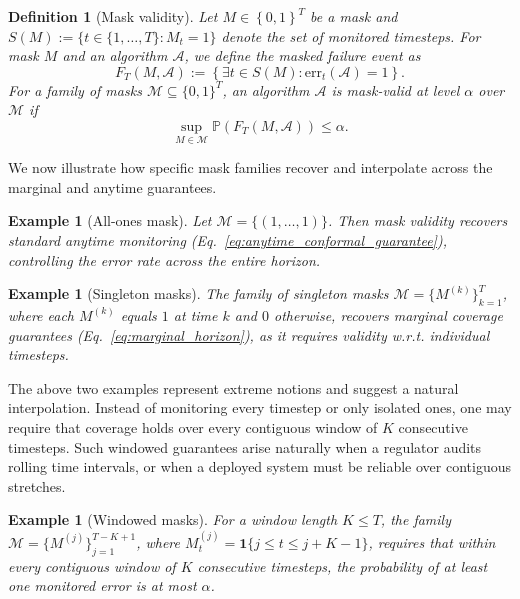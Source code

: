 \documentclass{uai2026} %
\newtheorem{definition}[theorem]{Definition}
\newtheorem{example}[theorem]{Example}
\newcommand{\1}{\mathbf{1}}
\newcommand{\ind}[1]{\mathbf{1}\{#1\}}
\newcommand{\prob}{\mathbb{P}}
\newcommand{\ens}[1]{\left\{#1\right\}}
\newcommand{\err}{\mathrm{err}}
\newcommand{\mcal}{\mathcal{M}}
\newcommand{\acal}{\mathcal{A}}
\begin{document}
\begin{definition}[Mask validity]
  \label{def:mask-validity}
  Let $M\in \ens{0,1}^T$ be a mask and $S(M) := \{t \in \{1,\dots,T\} \colon M_t=1\}$ denote the set of monitored timesteps. For mask $M$ and an algorithm $\acal$, we define the masked failure event as
  \begin{equation}
    \label{eq:mask_valid_norestart}
    F_T(M, \acal):=\left\{\exists t\in S(M)\colon \err_t(\acal) = 1\right\}.
  \end{equation}
  For a family of masks $\mcal \subseteq\{0,1\}^T$, an algorithm $\acal$ is \emph{mask-valid at level $\alpha$ over $\mcal$} if
  \begin{equation*}
    \sup_{M\in\mcal}\prob(F_T(M, \acal))\le\alpha.
  \end{equation*}
\end{definition}

We now illustrate how specific mask families recover and interpolate across the marginal and anytime guarantees.

\begin{example}[All-ones mask]
  Let $\mcal = \{(1, \ldots, 1)\}$. Then mask validity recovers standard anytime monitoring (Eq.~\ref{eq:anytime_conformal_guarantee}), controlling the error rate across the entire horizon.
\end{example}

\begin{example}[Singleton masks]
  The family of singleton masks $\mcal = \{ M^{(k)} \}_{k=1}^T$, where each $M^{(k)}$ equals $1$ at time $k$ and $0$ otherwise, recovers marginal coverage guarantees (Eq.~\ref{eq:marginal_horizon}), as it requires validity w.r.t. individual timesteps.
\end{example}

The above two examples represent extreme notions and suggest a natural interpolation. Instead of monitoring every timestep or only isolated ones, one may require that coverage holds over every contiguous window of $K$ consecutive timesteps. Such windowed guarantees arise naturally when a regulator audits rolling time intervals, or when a deployed system must be reliable over contiguous stretches.

\begin{example}[Windowed masks]
  For a window length $K \le T$, the family $\mcal = \{ M^{(j)} \}_{j=1}^{T-K+1}$, where $M^{(j)}_t = \ind{j \le t \le j+K-1}$, requires that within every contiguous window of $K$ consecutive timesteps, the probability of at least one monitored error is at most $\alpha$.
\end{example}
\end{document}
